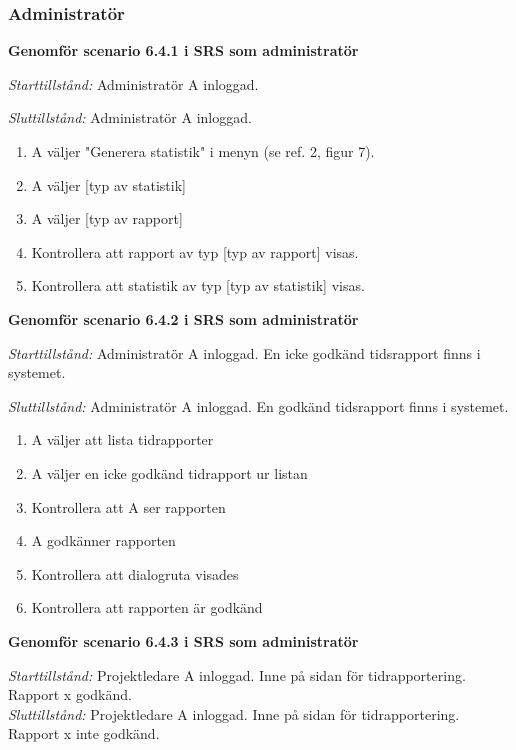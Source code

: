 \documentclass[a4paper]{article}
\begin{document}
\subsubsection{Administratör}

\begin{ST}

\item
\textbf{Genomför scenario 6.4.1 i SRS som administratör}

\emph{Starttillstånd:} Administratör A inloggad.

\emph{Sluttillstånd:} Administratör A inloggad.

\begin{enumerate}
\item
A väljer "Generera statistik" i menyn (se ref. 2, figur 7).
\item
A väljer [typ av statistik]
\item 
A väljer [typ av rapport]
\item
Kontrollera att rapport av typ [typ av rapport] visas.
\item
Kontrollera att statistik av typ [typ av statistik] visas.
\end{enumerate}

\item
\textbf{Genomför scenario 6.4.2 i SRS som administratör}

\emph{Starttillstånd:} Administratör A inloggad. En icke godkänd tidsrapport finns i systemet.

\emph{Sluttillstånd:} Administratör A inloggad. En godkänd tidsrapport finns i systemet.

\begin{enumerate}

\item
A väljer att lista tidrapporter
\item
A väljer en icke godkänd tidrapport ur listan
\item
Kontrollera att A ser rapporten
\item
A godkänner rapporten
\item
Kontrollera att dialogruta visades
\item
Kontrollera att rapporten är godkänd

\end{enumerate}

\item
\textbf{Genomför scenario 6.4.3 i SRS som administratör}

\emph{Starttillstånd:} Projektledare A inloggad. Inne på sidan för tidrapportering. Rapport x godkänd.\\
\emph{Sluttillstånd:} Projektledare A inloggad. Inne på sidan för tidrapportering. Rapport x inte godkänd.\\



\end{ST}
\end{document}
